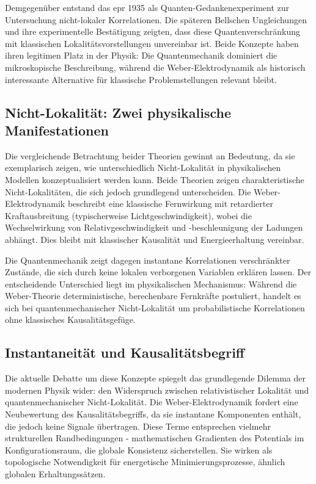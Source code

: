 Demgegenüber entstand das \gls{epr} 1935 als Quanten-Gedankenexperiment zur Untersuchung nicht-lokaler Korrelationen. Die späteren Bellschen Ungleichungen und ihre experimentelle
Bestätigung zeigten, dass diese Quantenverschränkung mit klassischen Lokalitätsvorstellungen unvereinbar ist. Beide Konzepte haben ihren legitimen Platz in der Physik: Die Quantenmechanik
dominiert die mikroskopische Beschreibung, während die Weber-Elektrodynamik als historisch interessante Alternative für klassische Problemstellungen relevant bleibt.

\subsection{Nicht-Lokalität: Zwei physikalische Manifestationen}
Die vergleichende Betrachtung beider Theorien gewinnt an Bedeutung, da sie exemplarisch zeigen, wie unterschiedlich Nicht-Lokalität in physikalischen Modellen konzeptualisiert
werden kann. Beide Theorien zeigen charakteristische Nicht-Lokalitäten, die sich jedoch grundlegend unterscheiden. Die Weber-Elektrodynamik beschreibt eine klassische Fernwirkung
mit retardierter Kraftausbreitung (typischerweise Lichtgeschwindigkeit), wobei die Wechselwirkung von Relativgeschwindigkeit und -beschleunigung der Ladungen abhängt. Dies bleibt mit
klassischer Kausalität und Energieerhaltung vereinbar.

Die Quantenmechanik zeigt dagegen instantane Korrelationen verschränkter Zustände, die sich durch keine lokalen verborgenen Variablen erklären lassen. Der entscheidende Unterschied
liegt im physikalischen Mechanismus: Während die Weber-Theorie deterministische, berechenbare Fernkräfte postuliert, handelt es sich bei quantenmechanischer Nicht-Lokalität um
probabilistische Korrelationen ohne klassisches Kausalitätsgefüge.

\subsection{Instantaneität und Kausalitätsbegriff}
Die aktuelle Debatte um diese Konzepte spiegelt das grundlegende Dilemma der modernen Physik wider: den Widerspruch zwischen relativistischer Lokalität und quantenmechanischer
Nicht-Lokalität. Die Weber-Elektrodynamik fordert eine Neubewertung des Kausalitätsbegriffs, da sie instantane Komponenten enthält, die jedoch keine Signale übertragen. Diese Terme
entsprechen vielmehr strukturellen Randbedingungen - mathematischen Gradienten des Potentials im Konfigurationsraum, die globale Konsistenz sicherstellen. Sie wirken als topologische
Notwendigkeit für energetische Minimierungsprozesse, ähnlich globalen Erhaltungssätzen.

